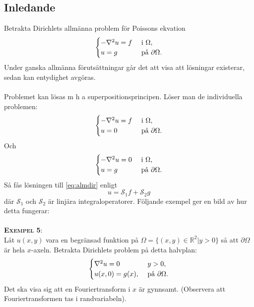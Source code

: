 \documentclass{article}
\begin{document}
\subsection{Inledande}
Betrakta Dirichlets allmänna problem för Poissons ekvation
\begin{equation}\label{eq:almdir}
    \begin{cases}
        -\nabla^2u=f \ &$i$ \ \Omega,\\
        u=g \ &$på$ \ \partial\Omega.
    \end{cases}
\end{equation}
Under ganska allmänna förutsättningar går det att visa att lösningar existerar, sedan kan entydighet avgöras.\\ \\
Problemet kan lösas m h a superpositionsprincipen. Löser man de individuella problemen:
\begin{equation}
    \begin{cases}
        -\nabla^2u=f \ &$i$ \ \Omega,\\
        u=0 \ &$på$ \ \partial\Omega.
    \end{cases}
\end{equation}
Och
\begin{equation}\label{eq:fall2}
    \begin{cases}
        -\nabla^2u=0 \ &$i$ \ \Omega,\\
        u=g \ &$på$ \ \partial\Omega.
    \end{cases}
\end{equation}
Så fås lösningen till \eqref{eq:almdir} enligt
\begin{equation}\label{eq:almlsn}
    u=\mathcal{S}_1f+\mathcal{S}_2g
\end{equation}
där $\mathcal{S}_1$ och $\mathcal{S}_2$ är linjära integraloperatorer. Följande exempel ger en bild av hur detta fungerar:\\ \\
\textbf{\textsc{Exempel 5}}:\\
Låt $u(x,y)$ vara en begränsad funktion på $\Omega=\{(x,y)\in\mathbb{R}^2|y>0\}$ så att $\partial\Omega$ är hela $x$-axeln. Betrakta Dirichlets problem på detta halvplan:
\begin{equation}
    \begin{cases}
        \nabla^2u=0 \ &y>0,\\
        u(x,0)=g(x), \ &$på$ \ \partial\Omega.
    \end{cases}
\end{equation}
Det ska visa sig att en Fouriertransform i $x$ är gynnsamt. (Observera att Fouriertransformen tas i randvariabeln).
\end{document}
